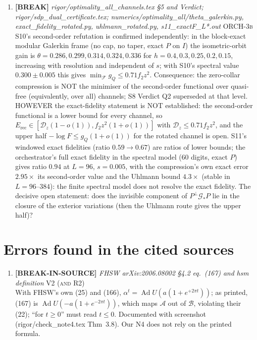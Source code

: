 \documentclass[11pt]{article}
\begin{document}
\begin{enumerate}[leftmargin=1.6em,itemsep=6pt]
\item \textbf{[BREAK]} \emph{rigor/optimality\_all\_channels.tex \S5 and Verdict; rigor/sdp\_dual\_certificate.tex; numerics/optimality\_all/theta\_galerkin.py, exact\_fidelity\_rotated.py, uhlmann\_rotated.py, s11\_exactF\_L*.out} \hfill\textsc{ORCH-3b}\\ S10's second-order refutation is confirmed independently: in the block-exact modular Galerkin frame (no cap, no taper, exact \(P\) on \(I\)) the isometric-orbit gain is \(\theta=0.286,0.299,0.314,0.324,0.336\) for \(h=0.4,0.3,0.25,0.2,0.15\), increasing with resolution and independent of \(s\); with S10's spectral value \(0.300\pm0.005\) this gives \(\min_{\mathcal F}g_Q\le0.71f_2z^2\). Consequence: the zero-collar compression is NOT the minimiser of the second-order functional over quasi-free (equivalently, over all) channels; S8 Verdict Q2 superseded at that level. HOWEVER the exact-fidelity statement is NOT established: the second-order functional is a lower bound for every channel, so \(E_{\mathrm{rec}}\in[\mathcal D_z(1-o(1)),f_2z^2(1+o(1))]\) with \(\mathcal D_z\le0.71f_2z^2\), and the upper half \(-\log F\le g_Q(1+o(1))\) for the rotated channel is open. S11's windowed exact fidelities (ratio \(0.59\to0.67\)) are ratios of lower bounds; the orchestrator's full exact fidelity in the spectral model (60 digits, exact \(P\)) gives ratio \(0.94\) at \(L=96\), \(s=0.005\), with the compression's own exact error \(2.95\times\) its second-order value and the Uhlmann bound \(4.3\times\) (stable in \(L=96\)--\(384\)): the finite spectral model does not resolve the exact fidelity. The decisive open statement: does the invisible component of \(P^\perp\mathcal G_*P\) lie in the closure of the exterior variations (then the Uhlmann route gives the upper half)?
\end{enumerate}
\section{Errors found in the cited sources}
\begin{enumerate}[leftmargin=1.6em,itemsep=6pt]
\item \textbf{[BREAK-IN-SOURCE]} \emph{FHSW arXiv:2006.08002 \S4.2 eq.\ (167) and hsm definition} \hfill\textsc{V2 (and R2)}\\ With FHSW's own (25) and (166), \(\alpha^t=\operatorname{Ad}U(a(1+e^{+2\pi t}))\); as printed, (167) is \(\operatorname{Ad}U(-a(1+e^{-2\pi t}))\), which maps \(\mathcal A\) out of \(\mathcal B\), violating their (22); ``for \(t\ge0\)'' must read \(t\le0\). Documented with screenshot (rigor/check\_note4.tex Thm~3.8). Our N4 does not rely on the printed formula.
\end{enumerate}
\end{document}
